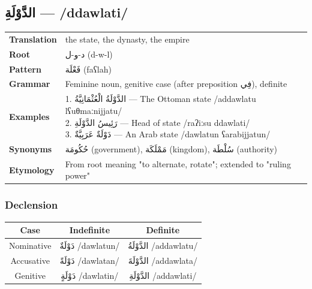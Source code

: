 \documentclass[letterpaper,12pt]{article}
\begin{document}
\subsection{\textarabic{الدَّوْلَةِ} — /ddawlati/}
\begin{tabular}{p{3cm}p{10cm}}
\toprule
\textbf{Translation} & the state, the dynasty, the empire \\
\textbf{Root} & \textarabic{د-و-ل} (d-w-l) \\
\textbf{Pattern} & \textarabic{فَعْلَة} (faʕlah) \\
\textbf{Grammar} & Feminine noun, genitive case (after preposition \textarabic{فِي}), definite \\
\midrule
\textbf{Examples} & \makecell[l]{\parbox{9.5cm}{
1. \textarabic{الدَّوْلَةُ الْعُثْمَانِيَّةُ} — The Ottoman state /addawlatu lʕuθmaːnijjatu/\\
2. \textarabic{رَئِيسُ الدَّوْلَةِ} — Head of state /raʔiːsu ddawlati/\\
3. \textarabic{دَوْلَةٌ عَرَبِيَّةٌ} — An Arab state /dawlatun ʕarabijjatun/
}} \\
\midrule
\textbf{Synonyms} & \textarabic{حُكُومَة} (government), \textarabic{مَمْلَكَة} (kingdom), \textarabic{سُلْطَة} (authority) \\
\textbf{Etymology} & From root meaning "to alternate, rotate"; extended to "ruling power" \\
\bottomrule
\end{tabular}

\subsubsection*{Declension}
\begin{tabular}{|c|c|c|}
\hline
\textbf{Case} & \textbf{Indefinite} & \textbf{Definite} \\
\hline
Nominative & \textarabic{دَوْلَةٌ} /dawlatun/ & \textarabic{الدَّوْلَةُ} /addawlatu/ \\
\hline
Accusative & \textarabic{دَوْلَةً} /dawlatan/ & \textarabic{الدَّوْلَةَ} /addawlata/ \\
\hline
Genitive & \textarabic{دَوْلَةٍ} /dawlatin/ & \textarabic{الدَّوْلَةِ} /addawlati/ \\
\hline
\end{tabular}
\end{document}

